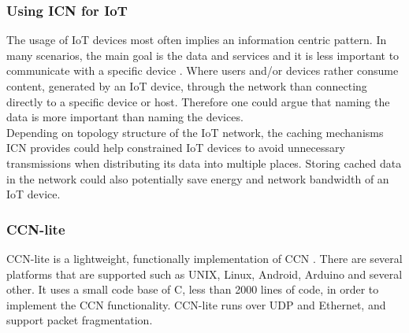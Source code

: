 \subsubsection{Using ICN for IoT}
The usage of IoT devices most often implies an information centric pattern. In many scenarios, the main goal is the data and services and it is less important to communicate with a specific device \cite{Ahlgreniot}. Where users and/or devices rather consume content, generated by an IoT device, through the network than connecting directly to a specific device or host. Therefore one could argue that naming the data is more important than naming the devices.\\
Depending on topology structure of the IoT network, the caching mechanisms ICN provides could help constrained IoT devices to avoid unnecessary transmissions when distributing its data into multiple places. Storing cached data in the network could also potentially save energy and network bandwidth of an IoT device.

% 




\subsubsection{CCN-lite}
CCN-lite is a lightweight, functionally implementation of CCN \cite{CCN-LITE}. There are several platforms that are supported such as UNIX, Linux, Android, Arduino and several other. It uses a small code base of C, less than 2000 lines of code, in order to implement the CCN functionality. CCN-lite runs over UDP and Ethernet, and support packet fragmentation.
\\




















